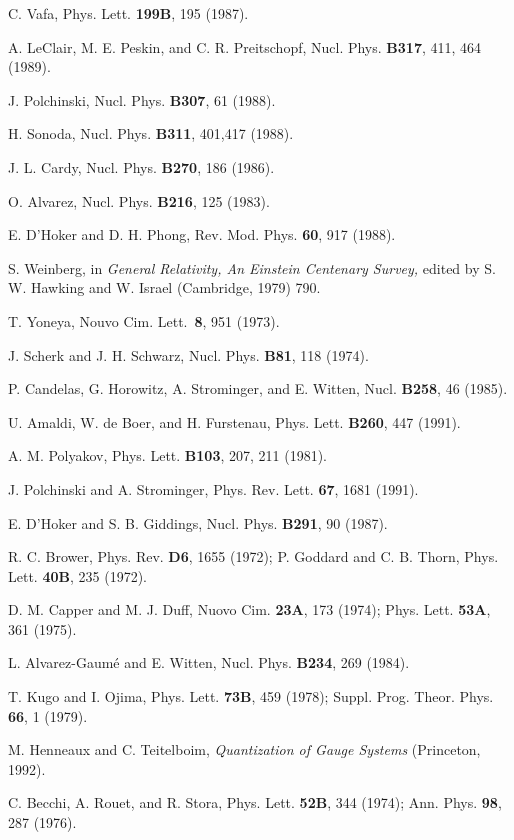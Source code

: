 \begin{thebibliography}{99}
 C. Vafa, Phys. Lett. {\bf 199B}, 195 (1987).

 A. LeClair, M. E. Peskin, and C. R.
Preitschopf, Nucl. Phys. {\bf B317}, 411, 464 (1989).  

 J. Polchinski, Nucl. Phys. {\bf B307}, 61
(1988).

 H. Sonoda, Nucl. Phys. {\bf B311}, 401,417
(1988).

 J. L. Cardy, Nucl. Phys. {\bf B270}, 186 (1986).

 O. Alvarez, Nucl. Phys. {\bf B216}, 125 (1983).

 E. D'Hoker and D. H.
Phong, Rev. Mod. Phys. {\bf 60}, 917 (1988).

 S. Weinberg, in {\it General Relativity, An
Einstein Centenary Survey,} edited by S. W. Hawking and W.
Israel (Cambridge, 1979) 790.

 T. Yoneya, Nouvo Cim. Lett.~{\bf 8}, 951
(1973).

 J. Scherk and J. H. Schwarz, Nucl. Phys. {\bf
B81}, 118 (1974).

 P. Candelas, G. Horowitz, A. Strominger, and
E. Witten, Nucl. {\bf B258}, 46 (1985).

 U. Amaldi, W. de Boer, and H. Furstenau,
Phys. Lett. {\bf B260}, 447 (1991).  

 A. M. Polyakov, Phys. Lett. {\bf B103},
207, 211 (1981).

 J. Polchinski and A. Strominger, Phys.
Rev. Lett. {\bf 67}, 1681 (1991).

 E. D'Hoker and S. B. Giddings, Nucl. Phys.
{\bf B291}, 90 (1987).

 R. C. Brower, Phys. Rev. {\bf D6}, 1655
(1972);
P. Goddard and C. B. Thorn, Phys. Lett.
{\bf 40B}, 235 (1972).

 D. M. Capper and M. J. Duff, Nuovo Cim. {\bf
23A}, 173 (1974); Phys. Lett. {\bf 53A}, 361 (1975).

 L. Alvarez-Gaum\'e and E. Witten,
Nucl. Phys. {\bf B234}, 269 (1984).  

 T. Kugo and I. Ojima, Phys. Lett. {\bf 73B}, 459
(1978); Suppl. Prog. Theor. Phys. {\bf 66}, 1 (1979).

 M. Henneaux and C. Teitelboim, 
{\it Quantization of Gauge Systems} (Princeton, 1992).

 C. Becchi, A. Rouet, and R. Stora, Phys. Lett. {\bf
52B}, 344 (1974); Ann. Phys. {\bf 98}, 287 (1976).


\end{thebibliography}
